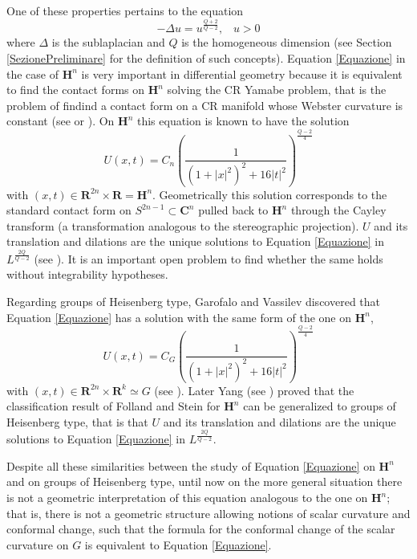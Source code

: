 \documentclass{article}
\newcommand{\R}{\mathbf{R}}
\newcommand{\C}{\mathbf{C}}
\renewcommand{\H}{\mathbf{H}}
\theoremstyle{definition}
\theoremstyle{remark}
\begin{document}
One of these properties pertains to the equation
\begin{equation}\label{Equazione}
 -\Delta u = u^{\frac{Q+2}{Q-2}}, \;\;\; u>0
\end{equation}
where $\Delta$ is the sublaplacian and $Q$ is the homogeneous dimension (see Section \ref{SezionePreliminare} for the definition of such concepts).
Equation \eqref{Equazione} in the case of $\H^n$ is very important in differential geometry because it is equivalent to find the contact forms on $\H^n$ solving the CR Yamabe problem, that is the problem of findind a contact form on a CR manifold whose Webster curvature is constant (see \cite{JL1} or \cite{DT}).
On $\H^n$ this equation is known to have the solution
$$U(x,t) = C_n\left(\frac{1}{(1+|x|^2)^2 + 16|t|^2}\right)^{\frac{Q-2}{4}}$$
with $(x,t)\in\R^{2n}\times\R=\H^n$. Geometrically this solution corresponds to the standard contact form on $S^{2n-1}\subset\C^n$ pulled back to $\H^n$ through the Cayley transform (a transformation analogous to the stereographic projection).
$U$ and its translation and dilations are the unique solutions to Equation \eqref{Equazione} in $L^{\frac{2Q}{Q-2}}$ (see \cite{JL2}). It is an important open problem to find whether the same holds without integrability hypotheses.

Regarding groups of Heisenberg type, Garofalo and Vassilev discovered that Equation \eqref{Equazione} has a solution with the same form of the one on $\H^n$,
$$U(x,t) = C_G\left(\frac{1}{(1+|x|^2)^2 + 16|t|^2}\right)^{\frac{Q-2}{4}}$$
with $(x,t)\in\R^{2n}\times\R^k\simeq G$ (see \cite{GV}).
Later Yang (see \cite{Y}) proved that the classification result of Folland and Stein for $\H^n$ can be generalized to groups of Heisenberg type, that is that $U$ and its translation and dilations are the unique solutions to Equation \eqref{Equazione} in $L^{\frac{2Q}{Q-2}}$.

Despite all these similarities between the study of Equation \eqref{Equazione} on $\H^n$ and on groups of Heisenberg type, until now on the more general situation there is not a geometric interpretation of this equation analogous to the one on $\H^n$; that is, there is not a geometric structure allowing notions of scalar curvature and conformal change, such that the formula for the conformal change of the scalar curvature on $G$ is equivalent to Equation \eqref{Equazione}.
\end{document}

